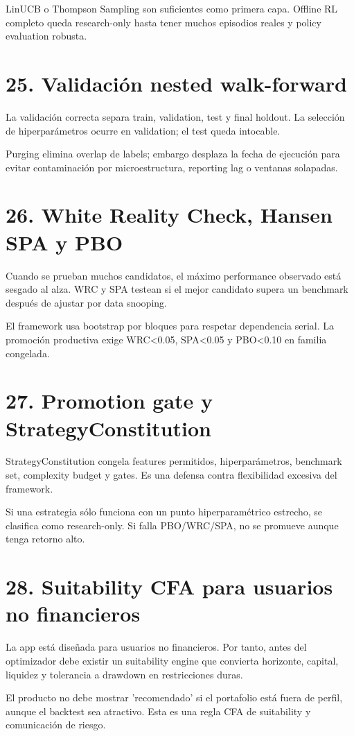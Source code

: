 \documentclass[11pt,letterpaper]{article}
\begin{document}
LinUCB o Thompson Sampling son suficientes como primera capa. Offline RL completo queda research-only hasta tener muchos episodios reales y policy evaluation robusta.

\section{25. Validación nested walk-forward}
La validación correcta separa train, validation, test y final holdout. La selección de hiperparámetros ocurre en validation; el test queda intocable.

Purging elimina overlap de labels; embargo desplaza la fecha de ejecución para evitar contaminación por microestructura, reporting lag o ventanas solapadas.

\section{26. White Reality Check, Hansen SPA y PBO}
Cuando se prueban muchos candidatos, el máximo performance observado está sesgado al alza. WRC y SPA testean si el mejor candidato supera un benchmark después de ajustar por data snooping.

El framework usa bootstrap por bloques para respetar dependencia serial. La promoción productiva exige WRC<0.05, SPA<0.05 y PBO<0.10 en familia congelada.

\section{27. Promotion gate y StrategyConstitution}
StrategyConstitution congela features permitidos, hiperparámetros, benchmark set, complexity budget y gates. Es una defensa contra flexibilidad excesiva del framework.

Si una estrategia sólo funciona con un punto hiperparamétrico estrecho, se clasifica como research-only. Si falla PBO/WRC/SPA, no se promueve aunque tenga retorno alto.

\section{28. Suitability CFA para usuarios no financieros}
La app está diseñada para usuarios no financieros. Por tanto, antes del optimizador debe existir un suitability engine que convierta horizonte, capital, liquidez y tolerancia a drawdown en restricciones duras.

El producto no debe mostrar 'recomendado' si el portafolio está fuera de perfil, aunque el backtest sea atractivo. Esta es una regla CFA de suitability y comunicación de riesgo.
\end{document}
